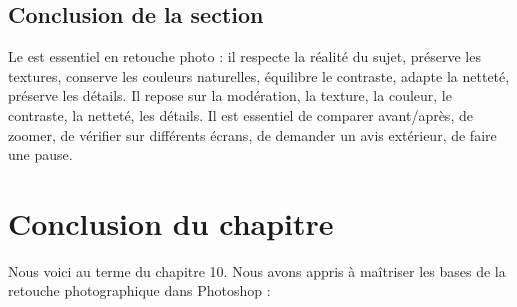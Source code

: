 \subsection*{Conclusion de la section}

Le  est essentiel en retouche photo : il respecte la réalité du sujet, préserve les textures, conserve les couleurs naturelles, équilibre le contraste, adapte la netteté, préserve les détails. Il repose sur la modération, la texture, la couleur, le contraste, la netteté, les détails. Il est essentiel de comparer avant/après, de zoomer, de vérifier sur différents écrans, de demander un avis extérieur, de faire une pause.

\section*{Conclusion du chapitre}

Nous voici au terme du chapitre 10. Nous avons appris à maîtriser les bases de la retouche photographique dans Photoshop :

